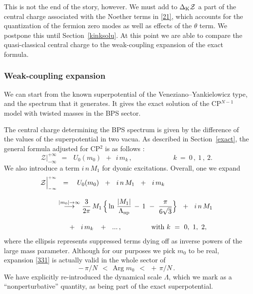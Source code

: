 \documentclass[epsfig,12pt]{article}
\def\beq{\begin{equation}}
\def\eeq{\end{equation}}
\def\beq{\begin{equation}}
\def\eeq{\end{equation}}
\newcommand{\mc}[1]{\mathcal{#1}}
\begin{document}
	This is not the end of the story, however. We must add to $\Delta_{\rm K}{\mathcal Z}$
	a part of the central charge associated with the Noether terms in \eqref{21}, which accounts for the quantization of the
	fermion zero modes as well as effects of the $\theta$ term.
	We postpone this until Section~\ref{kinksolu}.
	At this point we are able to compare the quasi-classical central charge 
	to the weak-coupling expansion of the exact formula.




\subsubsection{Weak-coupling expansion}
\label{weakexp}

	We can start from the known superpotential of the Veneziano--Yankielowicz type, and the spectrum that it generates.
	It gives the  exact solution of the CP$^{N-1}$ model with twisted masses in the BPS sector. 
	
	The central charge determining the BPS spectrum is given by the difference of the values of the superpotential in  two vacua.
	As described in Section~\ref{exact}, the general formula adjusted for CP$^2$ is as follows \cite{Bolokhov:2011mp}:
\beq
       \mc{Z}\Big|^{\scriptscriptstyle +\infty}_{\scriptscriptstyle -\infty} 
	~~=~~~ 
       U_0(m_0) ~~+~~ i\, m_k\,, \qquad\qquad\qquad k ~=~ 0\,,~1\,,~2.
\eeq
	We also introduce a term $ i\, n\, M_1 $ for dyonic excitations.
	Overall, one we expand
\begin{align}
%
\label{331}
       \mc{Z}\Big|^{\scriptscriptstyle +\infty}_{\scriptscriptstyle -\infty} 
       & 
	~~=~~~ 
       U_0(m_0)  ~~+~~ i\, n\, M_1 ~~+~~ i\, m_k
	\\[3mm]
%
\notag
       &
	\stackrel{|m_0|\to\infty}{\longrightarrow} 
       \frac{3}{2\pi}\, M_1\, \Big\{ \ln\, \frac {   |M_1|   }
                                                 {  \Lambda_\text{np}  } \,-\, 1 
						 ~-~ \frac{\pi}{6\sqrt{3}}
						\Big\}  ~~+~~  i\, n  \, M_1
	\\[3mm]
%
\notag
	&
	~~~
	~~+~~ i\,  m_k \,~~+~~ ...\,,
	\qquad\qquad\ \text{with}~ k ~=~ 0,~1,~ 2,
\end{align}
	where the ellipsis represents  suppressed terms dying off as inverse powers of the large mass parameter.
	Although for our purposes we pick $ m_0 $ to be real, expansion \eqref{331} is actually valid in 
	the whole sector of 
\beq
	 -\,\pi / N ~~<~~ \text{Arg}\;m_0 ~~<~~ +\,\pi / N \,.
\eeq
	We have explicitly re-introduced the dynamical scale $ \Lambda $, which we mark as a 
	``nonperturbative'' quantity, as being part of the exact superpotential.
\end{document}
